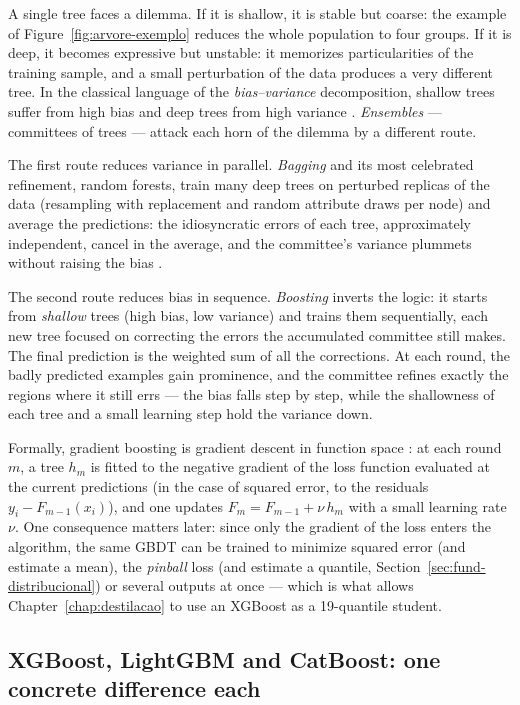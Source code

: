 A single tree faces a dilemma. If it is shallow, it is stable but
coarse: the example of Figure~\ref{fig:arvore-exemplo} reduces the
whole population to four groups. If it is deep, it becomes
expressive but unstable: it memorizes particularities of the
training sample, and a small perturbation of the data produces a
very different tree. In the classical language of the
\emph{bias--variance} decomposition, shallow trees suffer from high
bias and deep trees from high variance \citep{hastie2009}.
\emph{Ensembles} --- committees of trees --- attack each horn of the
dilemma by a different route.

The first route reduces variance in parallel. \emph{Bagging} and its
most celebrated refinement, random forests, train many deep trees on
perturbed replicas of the data (resampling with replacement and
random attribute draws per node) and average the predictions: the
idiosyncratic errors of each tree, approximately independent, cancel
in the average, and the committee's variance plummets without
raising the bias \citep{breiman2001}.

The second route reduces bias in sequence. \emph{Boosting} inverts
the logic: it starts from \emph{shallow} trees (high bias, low
variance) and trains them sequentially, each new tree focused on
correcting the errors the accumulated committee still makes. The
final prediction is the weighted sum of all the corrections. At each
round, the badly predicted examples gain prominence, and the
committee refines exactly the regions where it still errs --- the
bias falls step by step, while the shallowness of each tree and a
small learning step hold the variance down.

Formally, gradient boosting is gradient descent in function space
\citep{friedman2001}: at each round $m$, a tree $h_m$ is fitted to
the negative gradient of the loss function evaluated at the current
predictions (in the case of squared error, to the residuals
$y_i - F_{m-1}(x_i)$), and one updates $F_m = F_{m-1} + \nu\, h_m$
with a small learning rate $\nu$. One consequence matters later:
since only the gradient of the loss enters the algorithm, the same
GBDT can be trained to minimize squared error (and estimate a mean),
the \emph{pinball} loss (and estimate a quantile,
Section~\ref{sec:fund-distribucional}) or several outputs at once
--- which is what allows Chapter~\ref{chap:destilacao} to use an
XGBoost as a 19-quantile student.

\subsection{XGBoost, LightGBM and CatBoost: one concrete difference each}

